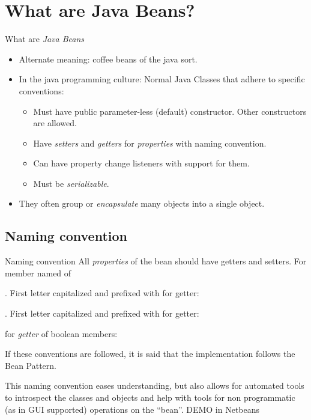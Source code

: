 \section[beans?]{What are Java Beans?}
\begin{frame}{What are \textit{Java Beans}}

  \begin{itemize}
  \item Alternate meaning: coffee beans of the java sort.
  \item In the java programming culture: Normal Java Classes that adhere to
    specific conventions:
    \begin{itemize}
    \item Must have public parameter-less (default) constructor. Other
      constructors are allowed.
    \item Have \textit{setters} and \textit{getters} for
      \textit{properties} with naming convention. 
    \item Can have property change listeners with support for them.
    \item Must be \textit{serializable}.
    \end{itemize}
  \item They often group or \textit{encapsulate} many objects into a
    single object.
  \end{itemize}
\end{frame}
\subsection[convention]{Naming convention}
\begin{frame}{Naming convention}
  All \textit{properties} of the bean should have getters and
  setters. For member named  of 
  \begin{description}[get]
  \item[getter]. First letter capitalized and
    prefixed with  for getter: 
  \item[setter].  First letter capitalized and
    prefixed with  for getter: 
  \item[is] for \textit{getter} of boolean members: 
  \end{description}
  If these conventions are followed, it is said that the
  implementation follows the Bean Pattern.

  This naming convention eases understanding, but also allows for
  automated tools to introspect the classes and objects and help with
  tools for non programmatic (as in GUI supported) operations on the
  \enquote{bean}. DEMO in Netbeans %
  
\end{frame}


